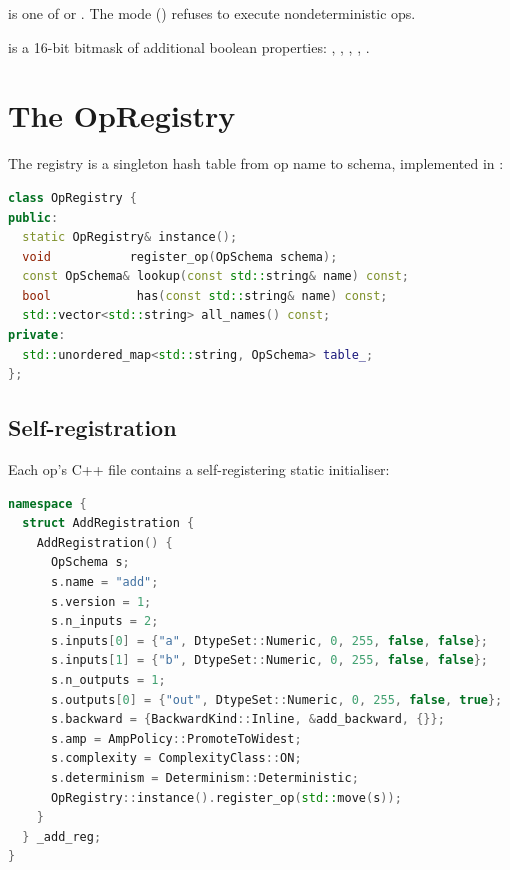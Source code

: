  is one of  or
. The  mode
() refuses to execute nondeterministic
ops.

 is a 16-bit bitmask of additional boolean properties:
, , ,
, .

\section{The OpRegistry}
\label{sec:op_registry:registry}

The registry is a singleton hash table from op name to schema,
implemented in
:

\begin{lstlisting}[style=lucidcpp,language=C++]
class OpRegistry {
public:
  static OpRegistry& instance();
  void           register_op(OpSchema schema);
  const OpSchema& lookup(const std::string& name) const;
  bool            has(const std::string& name) const;
  std::vector<std::string> all_names() const;
private:
  std::unordered_map<std::string, OpSchema> table_;
};
\end{lstlisting}

\subsection{Self-registration}
\label{ssec:op_registry:self_register}

Each op's C++ file contains a self-registering static initialiser:

\begin{lstlisting}[style=lucidcpp,language=C++]
namespace {
  struct AddRegistration {
    AddRegistration() {
      OpSchema s;
      s.name = "add";
      s.version = 1;
      s.n_inputs = 2;
      s.inputs[0] = {"a", DtypeSet::Numeric, 0, 255, false, false};
      s.inputs[1] = {"b", DtypeSet::Numeric, 0, 255, false, false};
      s.n_outputs = 1;
      s.outputs[0] = {"out", DtypeSet::Numeric, 0, 255, false, true};
      s.backward = {BackwardKind::Inline, &add_backward, {}};
      s.amp = AmpPolicy::PromoteToWidest;
      s.complexity = ComplexityClass::ON;
      s.determinism = Determinism::Deterministic;
      OpRegistry::instance().register_op(std::move(s));
    }
  } _add_reg;
}
\end{lstlisting}

